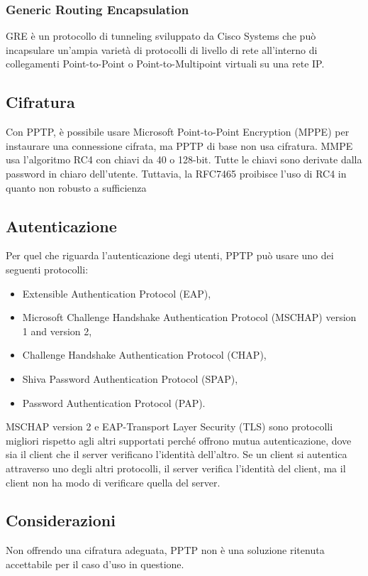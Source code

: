 \subsubsection{Generic Routing Encapsulation}
GRE è un protocollo di tunneling sviluppato da Cisco Systems che può incapsulare un'ampia varietà di protocolli di livello di rete all'interno di collegamenti Point-to-Point o Point-to-Multipoint virtuali su una rete IP.

\subsection{Cifratura}
Con PPTP, è possibile usare Microsoft Point-to-Point Encryption (MPPE) per instaurare una connessione cifrata, ma PPTP di base non usa cifratura. MMPE usa l'algoritmo RC4 con chiavi da 40 o 128-bit. Tutte le chiavi sono derivate dalla password in chiaro dell'utente. Tuttavia, la RFC7465 proibisce l'uso di RC4 in quanto non robusto a sufficienza

\subsection{Autenticazione}
Per quel che riguarda l'autenticazione degi utenti, PPTP può usare uno dei seguenti protocolli:
\begin{itemize}
    \item Extensible Authentication Protocol (EAP),
    \item Microsoft Challenge Handshake Authentication Protocol (MSCHAP) version 1 and version 2,
    \item Challenge Handshake Authentication Protocol (CHAP),
    \item Shiva Password Authentication Protocol (SPAP),
    \item Password Authentication Protocol (PAP).
\end{itemize}

MSCHAP version 2 e EAP-Transport Layer Security (TLS) sono protocolli migliori rispetto agli altri supportati perché offrono mutua autenticazione, dove sia il client che il server verificano l'identità dell'altro. Se un client si autentica attraverso uno degli altri protocolli, il server verifica l'identità del client, ma il client non ha modo di verificare quella del server.

\subsection{Considerazioni}
Non offrendo una cifratura adeguata, PPTP non è una soluzione ritenuta accettabile per il caso d'uso in questione.

